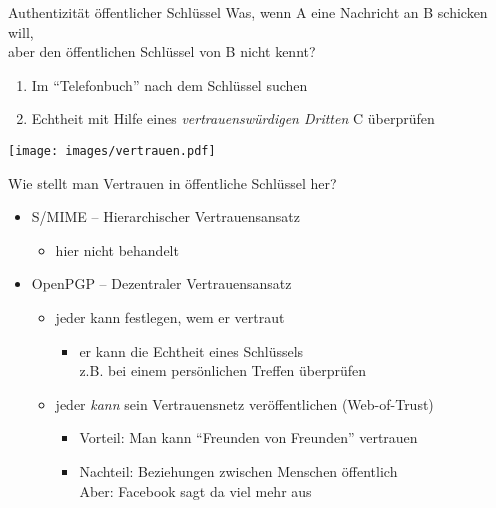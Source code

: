 \begin{frame}{Authentizität öffentlicher Schlüssel}
Was, wenn A eine Nachricht an B schicken will,\\ aber den öffentlichen Schlüssel von B nicht kennt?\\
\begin{enumerate}
  \item Im ``Telefonbuch'' nach dem Schlüssel suchen
  \item Echtheit mit Hilfe eines \emph{vertrauenswürdigen Dritten} C überprüfen
\end{enumerate}
\begin{center}
  \texttt{[image: images/vertrauen.pdf]}
\end{center}
\end{frame}

\begin{frame}{Wie stellt man Vertrauen in öffentliche Schlüssel her?}
  \begin{itemize}
    \item S/MIME -- Hierarchischer Vertrauensansatz
    \begin{itemize}
      \item hier nicht behandelt
    \end{itemize}
    \item OpenPGP -- Dezentraler Vertrauensansatz
    \begin{itemize}
      \item jeder kann festlegen, wem er vertraut
      \begin{itemize}
        \item er kann die Echtheit eines Schlüssels\\ z.B. bei einem persönlichen Treffen überprüfen
      \end{itemize}
      \item jeder \emph{kann} sein Vertrauensnetz veröffentlichen (Web-of-Trust)
      \begin{itemize}
        \item Vorteil: Man kann ``Freunden von Freunden'' vertrauen
        \item Nachteil: Beziehungen zwischen Menschen öffentlich\\ Aber: Facebook sagt da viel mehr aus
      \end{itemize}
    \end{itemize}
  \end{itemize}
\end{frame}

